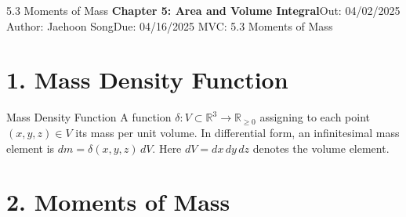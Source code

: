 \handout
{5.3 Moments of Mass}
{\textbf{Chapter 5: Area and Volume Integral}}{Out: 04/02/2025}
{Author: Jaehoon Song}{Due: 04/16/2025}
{MVC: 5.3 Moments of Mass}





% 

\newcommand{\NP}{\textsf{NP}}
\newcommand{\coNP}{\textsf{co-NP}}
\newcommand{\SAT}{\textsf{SAT}}
\newcommand{\coSAT}{\textsf{co-SAT}}
\newcommand{\VERTEXCOVER}{\textsf{VERTEX-COVER}}
\newcommand{\DOMINATINGSET}{\textsf{DOMINATING-SET}}
\newcommand{\SPANBOUND}{\textsf{SPAN-BOUND}}
\newcommand{\HAMPATH}{\textsf{HAM-PATH}}


















\section*{1. Mass Density Function}
\begin{define}{Mass Density Function}
  A function $\delta:V\subset\mathbb{R}^3\to\mathbb{R}_{\ge0}$ assigning to each point $(x,y,z)\in V$ its mass per unit volume.  In differential form, an infinitesimal mass element is $dm=\delta(x,y,z)\,dV$.  Here $dV=dx\,dy\,dz$ denotes the volume element.
\end{define}

\section*{2. Moments of Mass}

